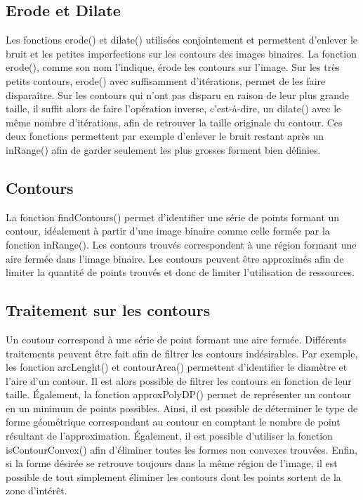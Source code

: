 \subsection{Erode et Dilate}

Les fonctions erode() et dilate() utilisées conjointement et permettent d'enlever le bruit et les petites imperfections sur les contours des images binaires. La fonction erode(), comme son nom l'indique, érode les contours sur l'image. Sur les très petits contours, erode() avec suffisamment d'itérations, permet de les faire disparaître. Sur les contours qui n'ont pas disparu en raison de leur plus grande taille, il suffit alors de faire l'opération inverse, c'est-à-dire, un dilate() avec le même nombre d'itérations, afin de retrouver la taille originale du contour. Ces deux fonctions permettent par exemple d'enlever le bruit restant après un inRange() afin de garder seulement les plus grosses forment bien définies.

\subsection{Contours}

La fonction findContours() permet d'identifier une série de points formant un contour, idéalement à partir d'une image binaire comme celle formée par la fonction inRange(). Les contours trouvés correspondent à une région formant une aire fermée dans l'image binaire. Les contours peuvent être approximés afin de limiter la quantité de points trouvés et donc de limiter l'utilisation de ressources.

\subsection{Traitement sur les contours}

Un coutour correspond à une série de point formant une aire fermée. Différents traitements peuvent être fait afin de filtrer les contours indésirables. Par exemple, les fonction arcLenght() et contourArea() permettent d'identifier le diamètre et l'aire d'un contour. Il est alors possible de filtrer les contours en fonction de leur taille. Également, la fonction approxPolyDP() permet de représenter un contour en un minimum de points possibles. Ainsi, il est possible de déterminer le type de forme géométrique correspondant au contour en comptant le nombre de point résultant de l'approximation. Également, il est possible d'utiliser la fonction isContourConvex() afin d'éliminer toutes les formes non convexes trouvées. Enfin, si la forme désirée se retrouve toujours dans la même région de l'image, il est possible de tout simplement éliminer les contours dont les points sortent de la zone d'intérêt.

